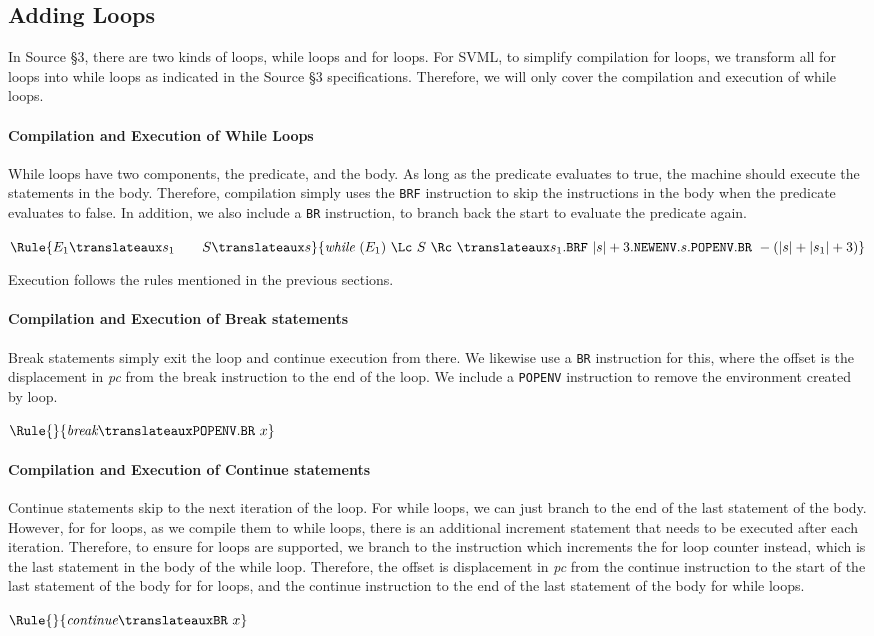\subsection{Adding Loops}

In Source §3, there are two kinds of loops, while loops and for loops.
For SVML, to simplify compilation for loops, we transform all for loops into while loops as
indicated in the Source §3 specifications. Therefore, we will only cover
the compilation and execution of while loops.

\paragraph{Compilation and Execution of While Loops}
While loops have two components, the predicate, and the body. As long as the
predicate evaluates to true, the machine should execute the statements in the body.
Therefore, compilation simply uses the \texttt{BRF} instruction to skip
the instructions in the body when the predicate evaluates to false.
In addition, we also include a \texttt{BR} instruction, to branch back
the start to evaluate the predicate again.

$\Rule{
E_1 \translateaux s_1 \qquad S \translateaux s}
{\textit{while}\ (E_1)\ \Lc\ S\ \Rc\ \translateaux s_1
.\texttt{BRF}\ |s|+3.\texttt{NEWENV}.s.\texttt{POPENV}
.\texttt{BR}\ -(|s|+|s_1|+3)}
$

Execution follows the rules mentioned in the previous sections.

\paragraph{Compilation and Execution of Break statements}
Break statements simply exit the loop and continue execution from there.
We likewise use a \texttt{BR} instruction for this, where the offset
is the displacement in \textit{pc} from the break instruction to the end 
of the loop. We include a
\texttt{POPENV} instruction to remove the environment created by loop.

$\Rule{}
{\textit{break} \translateaux \texttt{POPENV}.\texttt{BR}\ x}
$

\paragraph{Compilation and Execution of Continue statements}
Continue statements skip to the next iteration of the loop. For while loops,
we can just branch to the end of the last statement of the body. However, for 
for loops, as we compile them to while loops, there is an additional
increment statement that needs to be executed after each iteration. Therefore,
to ensure for loops are supported, we branch to the instruction which increments
the for loop counter instead, which is the last statement in the body of the while loop.
Therefore, the offset is displacement in \textit{pc} from the
continue instruction to the start of the last statement of the body for for loops, 
and the continue instruction to the end of the last statement of the body for while loops.

$\Rule{}
{\textit{continue} \translateaux \texttt{BR}\ x}
$